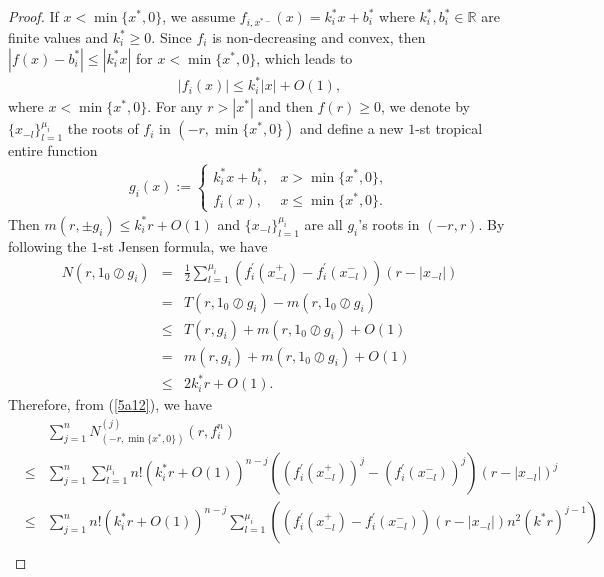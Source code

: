 \documentclass[10pt,a4paper]{amsart}
\begin{document}
\begin{proof}
    If $x<\min\{x^{*}, 0\}$, we assume $f_{i, x^{*-}}(x)=k_{i}^{*}x+b_{i}^{*}$ where $k_{i}^{*}, b_{i}^{*}\in\mathbb{R}$ are finite values and $k_{i}^{*}\geq 0$. Since $f_{i}$ is non-decreasing and convex, then $|f(x)-b_{i}^{*}|\leq |k_{i}^{*}x|$ for $x<\min\{x^{*}, 0\}$, which leads to
    \begin{eqnarray}\label{5a17}
        |f_{i}(x)|\leq k_{i}^{*}|x|+O(1),
    \end{eqnarray}
    where $x<\min\{x^{*}, 0\}$. For any $r>|x^{*}|$ and then $f(r)\geq 0$, we denote by $\{x_{-l}\}_{l=1}^{\mu_{i}}$ the roots of $f_{i}$ in $(-r, \min\{x^{*}, 0\})$ and define a new $1$-st tropical entire function
    \begin{eqnarray*}
        g_{i}(x):=\left\{\begin{array}{ll}
         k_{i}^{*}x+b_{i}^{*}, & x> \min\{x^{*}, 0\},\\
         f_{i}(x), & x\leq \min\{x^{*}, 0\}.
         \end{array}\right.
    \end{eqnarray*}
    Then $m(r, \pm g_{i})\leq k_{i}^{*}r+O(1)$ and $\{x_{-l}\}_{l=1}^{\mu_{i}}$ are all $g_{i}$'s roots in $(-r, r)$. By following the $1$-st Jensen formula, we have
    \begin{eqnarray*}
        N(r, 1_{0}\oslash g_{i})&=&\frac{1}{2}\sum_{l=1}^{\mu_{i}}(f_{i}^{'}(x_{-l}^{+})-f_{i}^{'}(x_{-l}^{-}))(r-|x_{-l}|)\\
        &=&T(r, 1_{0}\oslash g_{i})-m(r, 1_{0}\oslash g_{i})\\
        &\leq&T(r, g_{i})+m(r, 1_{0}\oslash g_{i})+O(1)\\
        &=&m(r, g_{i})+m(r, 1_{0}\oslash g_{i})+O(1)\\
        &\leq&2k_{i}^{*}r+O(1).
    \end{eqnarray*}
    Therefore, from (\ref{5a12}), we have 
    \begin{eqnarray}\label{5a18}
        &&\sum_{j=1}^{n}N_{(-r, \min\{x^{*}, 0\})}^{(j)}(r, f_{i}^{n})\nonumber\\
        &\leq&\sum_{j=1}^{n}\sum_{l=1}^{\mu_{i}}n!\left(k_{i}^{*}r+O(1)\right)^{n-j}\left((f_{i}^{'}(x_{-l}^{+}))^{j}-(f_{i}^{'}(x_{-l}^{-}))^{j}\right)(r-|x_{-l}|)^{j}\nonumber\\
        &\leq&\sum_{j=1}^{n}n!\left(k_{i}^{*}r+O(1)\right)^{n-j}\sum_{l=1}^{\mu_{i}}\left((f_{i}^{'}(x_{-l}^{+})-f_{i}^{'}(x_{-l}^{-}))(r-|x_{-l}|)n^{2}(k^{*}r)^{j-1}\right)\nonumber\\

\end{eqnarray}
\end{proof}
\end{document}
